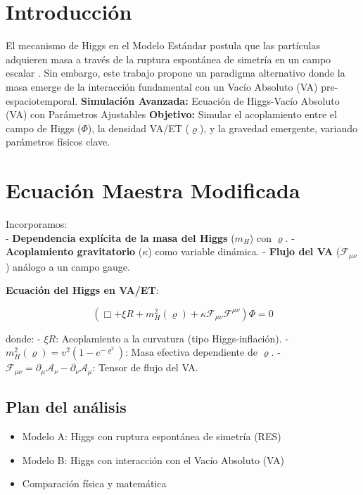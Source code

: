 \documentclass[twoside]{article}
\theoremstyle{definition}
\theoremstyle{remark}
\numberwithin{equation}{section}
\theoremstyle{definition}
\theoremstyle{example}
\theoremstyle{remark}
\numberwithin{equation}{section}%
\begin{document}
		
		
		\section{Introducción}
		
		El mecanismo de Higgs en el Modelo Estándar postula que las partículas adquieren masa a través de la ruptura espontánea de simetría en un campo escalar \cite{Higgs1964}. Sin embargo, este trabajo propone un paradigma alternativo donde la masa emerge de la interacción fundamental con un Vacío Absoluto (VA) pre-espaciotemporal.
		\textbf{Simulación Avanzada:} Ecuación de Higgs-Vacío Absoluto (VA) con Parámetros Ajustables  
		\textbf{Objetivo:} Simular el acoplamiento entre el campo de Higgs (\(\Phi\)), la densidad VA/ET (\(\varrho\)), y la gravedad emergente, variando parámetros físicos clave.  
		
		
		\section{Ecuación Maestra Modificada}
		Incorporamos:\\
		
		- \textbf{Dependencia explícita de la masa del Higgs} (\(m_H\)) con \(\varrho\).  
		- \textbf{Acoplamiento gravitatorio} (\(\kappa\)) como variable dinámica.  
		- \textbf{Flujo del VA} (\(\mathcal{F}_{\mu\nu}\)) análogo a un campo gauge.  
		
		\textbf{Ecuación del Higgs en VA/ET}: 
		
		\begin{equation}\label{e1}
			\left( \Box + \xi R + m_H^2(\varrho) + \kappa \mathcal{F}_{\mu\nu} \mathcal{F}^{\mu\nu} \right) \Phi = 0
		\end{equation} 
		
		donde:  
		- \(\xi R\): Acoplamiento a la curvatura (tipo Higgs-inflación).  
		- \(m_H^2(\varrho) = v^2 (1 - e^{-\varrho^2})\): Masa efectiva dependiente de \(\varrho\).  
		- \(\mathcal{F}_{\mu\nu} = \partial_\mu \mathcal{A}_\nu - \partial_\nu \mathcal{A}_\mu\): Tensor de flujo del VA.  
		
		
		\subsection{Plan del análisis}
		
		\begin{itemize}
			\item Modelo A: Higgs con ruptura espontánea de simetría (RES)			
			\item Modelo B: Higgs con interacción con el Vacío Absoluto (VA)			
			\item Comparación física y matemática
		\end{itemize}
		
\end{document}
